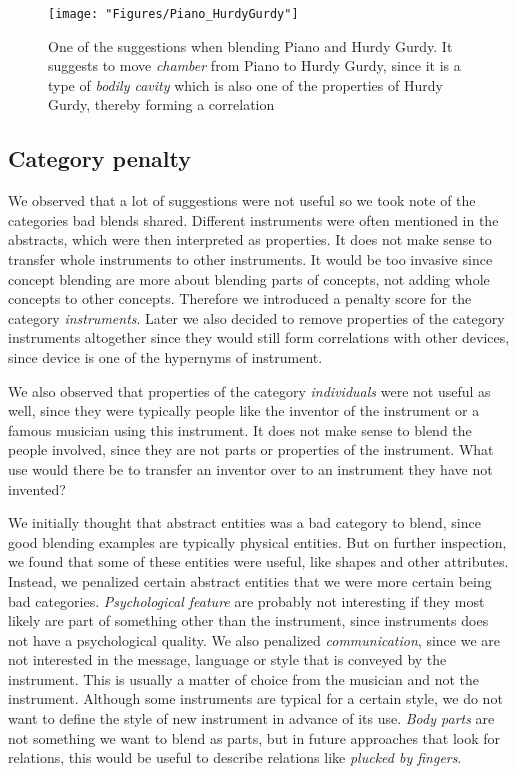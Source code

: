 \begin{figure}
	\centering
	\texttt{[image: "Figures/Piano\_HurdyGurdy"]}
	\caption{One of the suggestions when blending Piano and Hurdy Gurdy. It suggests to move \emph{chamber} from Piano to Hurdy Gurdy, since it is a type of \emph{bodily cavity} which is also one of the properties of Hurdy Gurdy, thereby forming a correlation }
	\label{fig:piano-hurdy-gurdy}
\end{figure}

\subsection{Category penalty}
We observed that a lot of suggestions were not useful so we took note of the categories bad blends shared. Different instruments were often mentioned in the abstracts, which were then interpreted as properties. It does not make sense to transfer whole instruments to other instruments. It would be too invasive since concept blending are more about blending parts of concepts, not adding whole concepts to other concepts. Therefore we introduced a penalty score for the category \emph{instruments}. Later we also decided to remove properties of the category instruments altogether since they would still form correlations with other devices, since device is one of the hypernyms of instrument.

We also observed that properties of the category \emph{individuals} were not useful as well, since they were typically people like the inventor of the instrument or a famous musician using this instrument. It does not make sense to blend the people involved, since they are not parts or properties of the instrument. What use would there be to transfer an inventor over to an instrument they have not invented?

We initially thought that abstract entities was a bad category to blend, since good blending examples are typically physical entities. But on further inspection, we found that some of these entities were useful, like shapes and other attributes. Instead, we penalized certain abstract entities that we were more certain being bad categories. \emph{Psychological feature} are probably not interesting if they most likely are part of something other than the instrument, since instruments does not have a psychological quality. We also penalized \emph{communication}, since we are not interested in the message, language or style that is conveyed by the instrument. This is usually a matter of choice from the musician and not the instrument. Although some instruments are typical for a certain style, we do not want to define the style of new instrument in advance of its use. \emph{Body parts} are not something we want to blend as parts, but in future approaches that look for relations, this would be useful to describe relations like \emph{plucked by fingers}.

